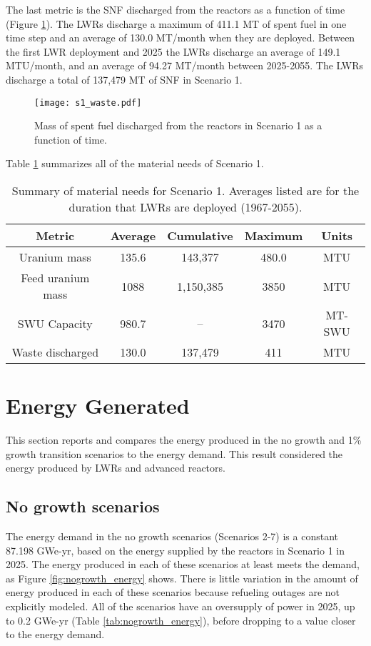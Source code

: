 The last metric is the \gls{SNF} discharged from the reactors as a function of
time (Figure \ref{fig:waste1}). The \glspl{LWR} discharge a maximum of 411.1 MT 
of spent fuel in one time step and an average of 130.0 MT/month when they are 
deployed. Between the first \gls{LWR} deployment and 2025 the \glspl{LWR} 
discharge an average of 149.1 MTU/month, and an average of 94.27 MT/month  
between 2025-2055. The \glspl{LWR} discharge a total of 137,479 MT of \gls{SNF} 
in Scenario 1. 

\begin{figure}
    \centering
    \texttt{[image: s1\_waste.pdf]}
    \caption{Mass of spent fuel discharged from the reactors in Scenario 1 as a function of time.}
    \label{fig:waste1}
\end{figure}

Table \ref{tab:s1_results} summarizes all of the material needs of Scenario 1. 

\begin{table}
    \centering
    \caption{Summary of material needs for Scenario 1. Averages listed 
    are for the duration that \glspl{LWR} are deployed (1967-2055).}
    \label{tab:s1_results}
    \begin{tabular}{c c c c c}
        \hline 
        Metric & Average & Cumulative & Maximum & Units \\\hline
        Uranium mass & 135.6 & 143,377 & 480.0 & MTU \\
        Feed uranium mass & 1088 & 1,150,385 & 3850 & MTU \\
        SWU Capacity & 980.7 & -- & 3470 & MT-SWU \\
        Waste discharged & 130.0 & 137,479 & 411 & MTU \\
        \hline        
    \end{tabular}
\end{table}

\section{Energy Generated} \label{sec:energy}
This section reports and compares the energy produced in the no growth and 
1\% growth transition scenarios to the energy demand. This result 
considered the energy produced by \glspl{LWR} and advanced reactors. 

\subsection{No growth scenarios}
The energy demand in the no growth scenarios (Scenarios 2-7) is a constant
87.198 GWe-yr, based on the energy supplied by the reactors in Scenario 1
in 2025. The energy produced in each of these scenarios at least meets the 
demand, as Figure \ref{fig:nogrowth_energy} shows. There is little variation 
in the amount of energy produced in each of these scenarios because refueling 
outages are not explicitly modeled. All of the scenarios have an oversupply 
of power in 2025, up to 0.2 GWe-yr (Table \ref{tab:nogrowth_energy}), before 
dropping to a value closer to the energy demand.  

